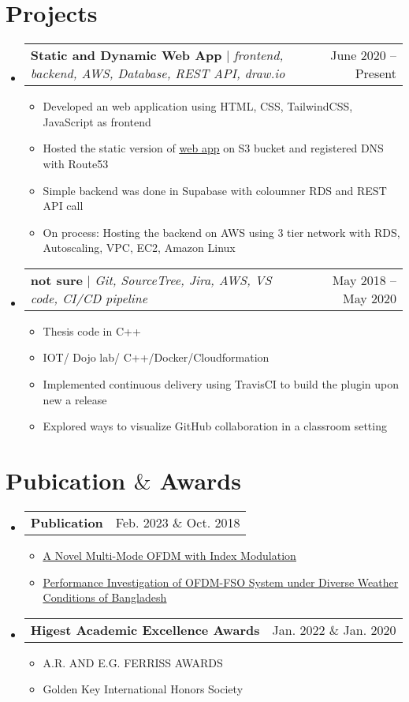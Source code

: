\documentclass[letterpaper,11pt]{article}
\makeatletter
\newcommand{\resumeItem}[1]{
  \item\small{
    {#1 \vspace{-2pt}}
  }
}
\newcommand{\resumeProjectHeading}[2]{
    \item
    \begin{tabular*}{0.97\textwidth}{l@{\extracolsep{\fill}}r}
      \small#1 & #2 \\
    \end{tabular*}\vspace{-7pt}
}
\newcommand{\resumeSubHeadingListStart}{\begin{itemize}[leftmargin=0.15in, label={}]}
\newcommand{\resumeSubHeadingListEnd}{\end{itemize}}
\newcommand{\resumeItemListStart}{\begin{itemize}}
\newcommand{\resumeItemListEnd}{\end{itemize}\vspace{-5pt}}
\makeatother
\begin{document}
\section{Projects}
    \resumeSubHeadingListStart
      \resumeProjectHeading
          {\textbf{Static and Dynamic Web App} $|$ \emph{frontend, backend, AWS, Database, REST API, draw.io}}{June 2020 -- Present}
          \resumeItemListStart
            \resumeItem{Developed an web application using HTML, CSS, TailwindCSS, JavaScript as frontend}
            \resumeItem{Hosted the static version of \href{http://agnilabarua.click/}{\underline{web app}} on S3 bucket and registered DNS with Route53}
            \resumeItem{Simple backend was done in Supabase with coloumner RDS and REST API call}
            \resumeItem{On process: Hosting the backend on AWS using 3 tier network with RDS, Autoscaling, VPC, EC2, Amazon Linux}
          \resumeItemListEnd
      \resumeProjectHeading
          {\textbf{not sure} $|$ \emph{Git, SourceTree, Jira, AWS, VS code, CI/CD pipeline}}{May 2018 -- May 2020}
          \resumeItemListStart
            \resumeItem{Thesis code in C++}
            \resumeItem{IOT/ Dojo lab/ C++/Docker/Cloudformation}
            \resumeItem{Implemented continuous delivery using TravisCI to build the plugin upon new a release}
            \resumeItem{Explored ways to visualize GitHub collaboration in a classroom setting}
          \resumeItemListEnd
    \resumeSubHeadingListEnd


    \section{Pubication $\&$ Awards}
    \resumeSubHeadingListStart
      \resumeProjectHeading
          {\textbf{Publication}} {Feb. 2023 $\&$ Oct. 2018}
          \resumeItemListStart
            \resumeItem{ \href{https://scholar.uwindsor.ca/etd/8946}{\underline{A Novel Multi-Mode OFDM with Index Modulation}}}
            \resumeItem{ \href{https://ijece.iaescore.com/index.php/IJECE/article/view/9400}{\underline{Performance Investigation of OFDM-FSO System under Diverse Weather Conditions of Bangladesh}}}
          \resumeItemListEnd
      \resumeProjectHeading
          {\textbf{Higest Academic Excellence Awards}} {Jan. 2022 $\&$ Jan. 2020}
          \resumeItemListStart
            \resumeItem{A.R. AND E.G. FERRISS AWARDS}
            \resumeItem{Golden Key International Honors Society}
          \resumeItemListEnd
    \resumeSubHeadingListEnd


\end{document}
